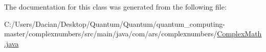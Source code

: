 The documentation for this class was generated from the following file\+:\begin{DoxyCompactItemize}
\item 
C\+:/\+Users/\+Dacian/\+Desktop/\+Quantum/\+Quantum/quantum\+\_\+computing-\/master/complexnumbers/src/main/java/com/ars/complexnumbers/\hyperlink{_complex_math_8java}{Complex\+Math.\+java}\end{DoxyCompactItemize}
